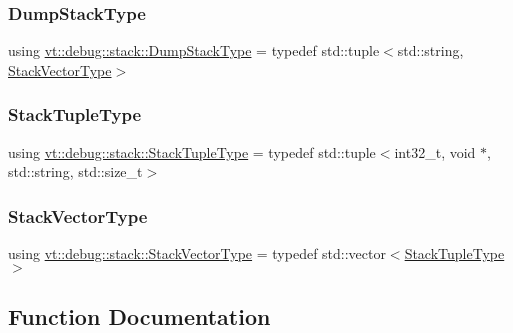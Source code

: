 \subsubsection{\texorpdfstring{Dump\+Stack\+Type}{DumpStackType}}
{\footnotesize\ttfamily using \hyperlink{namespacevt_1_1debug_1_1stack_af0021ab2e0ec90b6c299c2e7a62d0257}{vt\+::debug\+::stack\+::\+Dump\+Stack\+Type} = typedef std\+::tuple$<$std\+::string, \hyperlink{namespacevt_1_1debug_1_1stack_a29a3bbd4c51f20720ef437f124de9b62}{Stack\+Vector\+Type}$>$}

\mbox{\label{namespacevt_1_1debug_1_1stack_af6f37721aa17b48f85795cdaab356ced}} 
\subsubsection{\texorpdfstring{Stack\+Tuple\+Type}{StackTupleType}}
{\footnotesize\ttfamily using \hyperlink{namespacevt_1_1debug_1_1stack_af6f37721aa17b48f85795cdaab356ced}{vt\+::debug\+::stack\+::\+Stack\+Tuple\+Type} = typedef std\+::tuple$<$int32\+\_\+t, void $\ast$, std\+::string, std\+::size\+\_\+t$>$}

\mbox{\label{namespacevt_1_1debug_1_1stack_a29a3bbd4c51f20720ef437f124de9b62}} 
\subsubsection{\texorpdfstring{Stack\+Vector\+Type}{StackVectorType}}
{\footnotesize\ttfamily using \hyperlink{namespacevt_1_1debug_1_1stack_a29a3bbd4c51f20720ef437f124de9b62}{vt\+::debug\+::stack\+::\+Stack\+Vector\+Type} = typedef std\+::vector$<$\hyperlink{namespacevt_1_1debug_1_1stack_af6f37721aa17b48f85795cdaab356ced}{Stack\+Tuple\+Type}$>$}



\subsection{Function Documentation}
\mbox{\label{namespacevt_1_1debug_1_1stack_a89827f4a5411b18eb8fd0ea41d7b869d}} 
